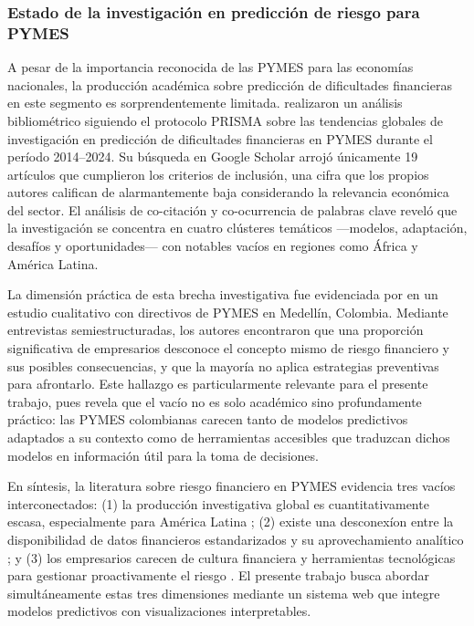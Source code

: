 \documentclass[12pt, letterpaper]{article}
\begin{document}
\subsubsection{Estado de la investigaci\'on en predicci\'on de riesgo para PYMES}

A pesar de la importancia reconocida de las PYMES para las econom\'ias nacionales, la producci\'on acad\'emica sobre predicci\'on de dificultades financieras en este segmento es sorprendentemente limitada. \citet{Abubakar2025} realizaron un an\'alisis bibliom\'etrico siguiendo el protocolo PRISMA sobre las tendencias globales de investigaci\'on en predicci\'on de dificultades financieras en PYMES durante el per\'iodo 2014--2024. Su b\'usqueda en Google Scholar arroj\'o \'unicamente 19 art\'iculos que cumplieron los criterios de inclusi\'on, una cifra que los propios autores califican de alarmantemente baja considerando la relevancia econ\'omica del sector. El an\'alisis de co-citaci\'on y co-ocurrencia de palabras clave revel\'o que la investigaci\'on se concentra en cuatro cl\'usteres tem\'aticos ---modelos, adaptaci\'on, desaf\'ios y oportunidades--- con notables vac\'ios en regiones como \'Africa y Am\'erica Latina.

La dimensi\'on pr\'actica de esta brecha investigativa fue evidenciada por \citet{CardonaZuleta2025} en un estudio cualitativo con directivos de PYMES en Medell\'in, Colombia. Mediante entrevistas semiestructuradas, los autores encontraron que una proporci\'on significativa de empresarios desconoce el concepto mismo de riesgo financiero y sus posibles consecuencias, y que la mayor\'ia no aplica estrategias preventivas para afrontarlo. Este hallazgo es particularmente relevante para el presente trabajo, pues revela que el vac\'io no es solo acad\'emico sino profundamente pr\'actico: las PYMES colombianas carecen tanto de modelos predictivos adaptados a su contexto como de herramientas accesibles que traduzcan dichos modelos en informaci\'on \'util para la toma de decisiones.

En s\'intesis, la literatura sobre riesgo financiero en PYMES evidencia tres vac\'ios interconectados: (1) la producci\'on investigativa global es cuantitativamente escasa, especialmente para Am\'erica Latina \citep{Abubakar2025}; (2) existe una desconex\'ion entre la disponibilidad de datos financieros estandarizados y su aprovechamiento anal\'itico \citep{HigueraVargas2021}; y (3) los empresarios carecen de cultura financiera y herramientas tecnol\'ogicas para gestionar proactivamente el riesgo \citep{CardonaZuleta2025, Senaya2025}. El presente trabajo busca abordar simult\'aneamente estas tres dimensiones mediante un sistema web que integre modelos predictivos con visualizaciones interpretables.
\end{document}
